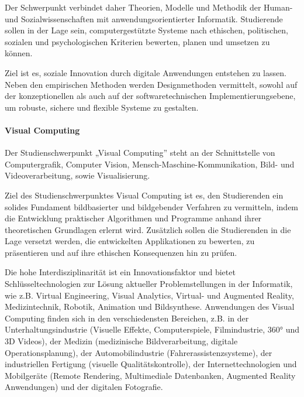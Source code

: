 Der Schwerpunkt verbindet daher Theorien, Modelle und Methodik der
Human- und Sozialwissenschaften mit anwendungsorientierter Informatik.
Studierende sollen in der Lage sein, computergestützte Systeme nach
ethischen, politischen, sozialen und psychologischen Kriterien bewerten,
planen und umsetzen zu können.

Ziel ist es, soziale Innovation durch digitale Anwendungen entstehen zu
lassen. Neben den empirischen Methoden werden Designmethoden vermittelt,
sowohl auf der konzeptionellen als auch auf der softwaretechnischen
Implementierungsebene, um robuste, sichere und flexible Systeme zu
gestalten.

\paragraph{Visual
Computing\label{/mi-2017/selbstbericht/0400-studiengangskonzept/0000-studiengangskonzept}}\label{visual-computingpathlabelmi-2017selbstbericht0400-studiengangskonzept0000-studiengangskonzept}

Der Studienschwerpunkt „Visual Computing'' steht an der Schnittstelle
von Computergrafik, Computer Vision, Mensch-Maschine-Kommunikation,
Bild- und Videoverarbeitung, sowie Visualisierung.

Ziel des Studienschwerpunktes Visual Computing ist es, den Studierenden
ein solides Fundament bildbasierter und bildgebender Verfahren zu
vermitteln, indem die Entwicklung praktischer Algorithmen und Programme
anhand ihrer theoretischen Grundlagen erlernt wird. Zusätzlich sollen
die Studierenden in die Lage versetzt werden, die entwickelten
Applikationen zu bewerten, zu präsentieren und auf ihre ethischen
Konsequenzen hin zu prüfen.

Die hohe Interdisziplinarität ist ein Innovationsfaktor und bietet
Schlüsseltechnologien zur Lösung aktueller Problemstellungen in der
Informatik, wie z.B. Virtual Engineering, Visual Analytics, Virtual- und
Augmented Reality, Medizintechnik, Robotik, Animation und Bildsynthese.
Anwendungen des Visual Computing finden sich in den verschiedensten
Bereichen, z.B. in der Unterhaltungsindustrie (Visuelle Effekte,
Computerspiele, Filmindustrie, 360° und 3D Videos), der Medizin
(medizinische Bildverarbeitung, digitale Operationsplanung), der
Automobilindustrie (Fahrerassistenzsysteme), der industriellen Fertigung
(visuelle Qualitätskontrolle), der Internettechnologien und Mobilgeräte
(Remote Rendering, Multimediale Datenbanken, Augmented Reality
Anwendungen) und der digitalen Fotografie.

